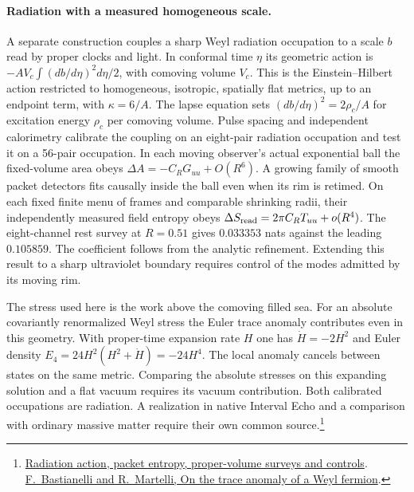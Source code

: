 \documentclass[11pt]{article}
\begin{document}
\paragraph{Radiation with a measured homogeneous scale.}
A separate construction couples a sharp Weyl radiation occupation to a
scale $b$ read by proper clocks and light. In conformal time $\eta$ its
geometric action is $-AV_c\int (db/d\eta)^2d\eta/2$, with comoving
volume $V_c$. This is the Einstein--Hilbert action restricted to
homogeneous, isotropic, spatially flat metrics, up to an endpoint term,
with $\kappa=6/A$. The lapse equation sets $(db/d\eta)^2=2\rho_c/A$
for excitation energy $\rho_c$ per comoving volume. Pulse spacing and
independent calorimetry calibrate the coupling on an eight-pair
radiation occupation and test it on a 56-pair occupation.
In each moving observer's actual exponential ball the fixed-volume area
obeys $\Delta A=-C_R G_{uu}+O(R^6)$. A growing family of smooth packet
detectors fits causally inside the ball even when its rim is retimed.
On each fixed finite menu of frames and comparable shrinking radii,
their independently measured field entropy obeys
$\Delta S_{\rm read}=2\pi C_R T_{uu}+o(R^4)$.
The eight-channel rest survey at $R=0.51$ gives $0.033353$ nats against
the leading $0.105859$. The coefficient follows from the analytic
refinement. Extending this result to a sharp ultraviolet boundary
requires control of the modes admitted by its moving rim.

The stress used here is the work above the comoving filled sea.
For an absolute covariantly renormalized Weyl stress the Euler trace
anomaly contributes even in this geometry. With proper-time expansion
rate $H$ one has $\dot H=-2H^2$ and Euler density
$E_4=24H^2(H^2+\dot H)=-24H^4$. The local anomaly cancels between
states on the same metric. Comparing the absolute stresses on this
expanding solution and a flat vacuum requires its vacuum contribution.
Both calibrated occupations are radiation. A realization in native
Interval Echo and a comparison with ordinary massive matter require
their own common source.\footnote{\href{https://github.com/FloatingPragma/observer-patch-holography/tree/main/code/matched_einstein_limit/source_implication/modular_orbit/weyl_balls/radiation}{Radiation action, packet entropy, proper-volume surveys and controls}.
\href{https://arxiv.org/abs/1610.02304}{F.~Bastianelli and R.~Martelli, On the trace anomaly of a Weyl fermion}.}
\end{document}
